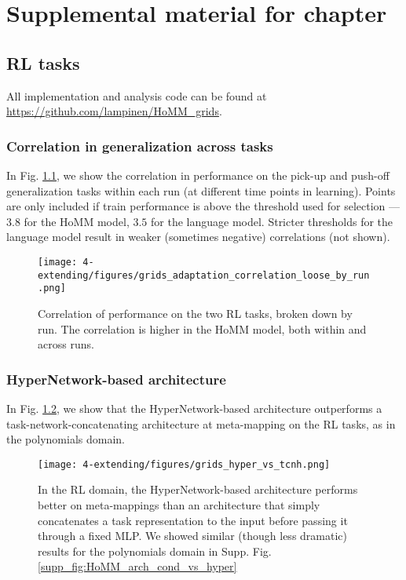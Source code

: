 \chapter{Supplemental material for chapter } \label{appendix:extending}

\section{RL tasks} \label{app:extending_grids_methods}

All implementation and analysis code can be found at \url{https://github.com/lampinen/HoMM_grids}.\par


\subsection{Correlation in generalization across tasks}
In Fig. \ref{fig:app_extending:RL_correlation_by_run}, we show the correlation in performance on the pick-up and push-off generalization tasks within each run (at different time points in learning). Points are only included if train performance is above the threshold used for selection --- \(3.8\) for the HoMM model, \(3.5\) for the language model. Stricter thresholds for the language model result in weaker (sometimes negative) correlations (not shown). \par 
\begin{figure}
\centering
\texttt{[image: 4-extending/figures/grids\_adaptation\_correlation\_loose\_by\_run.png]}
\caption[Correlation of performance on the RL tasks, by run.]{Correlation of performance on the two RL tasks, broken down by run. The correlation is higher in the HoMM model, both within and across runs.} \label{fig:app_extending:RL_correlation_by_run}
\end{figure}


\subsection{HyperNetwork-based architecture}
In Fig. \ref{supp_fig:extending:RL:arch_cond_vs_hyper}, we show that the HyperNetwork-based architecture outperforms a task-network-concatenating architecture at meta-mapping on the RL tasks, as in the polynomials domain. \par 

\begin{figure}
\centering
\texttt{[image: 4-extending/figures/grids\_hyper\_vs\_tcnh.png]}
\caption{In the RL domain, the HyperNetwork-based architecture performs better on meta-mappings than an architecture that simply concatenates a task representation to the input before passing it through a fixed MLP. We showed similar (though less dramatic) results for the polynomials domain in Supp. Fig. \ref{supp_fig:HoMM_arch_cond_vs_hyper}}\label{supp_fig:extending:RL:arch_cond_vs_hyper}
\end{figure}


